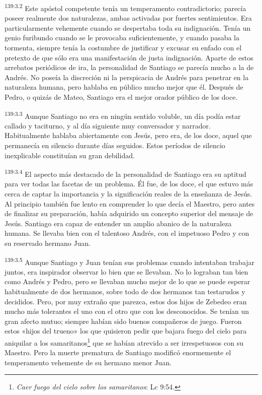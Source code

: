 \par
\textsuperscript{139:3.2} Este apóstol competente tenía un temperamento contradictorio; parecía poseer realmente dos naturalezas, ambas activadas por fuertes sentimientos. Era particularmente vehemente cuando se despertaba toda su indignación. Tenía un genio furibundo cuando se le provocaba suficientemente, y cuando pasaba la tormenta, siempre tenía la costumbre de justificar y excusar su enfado con el pretexto de que sólo era una manifestación de justa indignación. Aparte de estos arrebatos periódicos de ira, la personalidad de Santiago se parecía mucho a la de Andrés. No poseía la discreción ni la perspicacia de Andrés para penetrar en la naturaleza humana, pero hablaba en público mucho mejor que él. Después de Pedro, o quizás de Mateo, Santiago era el mejor orador público de los doce.

\par
\textsuperscript{139:3.3} Aunque Santiago no era en ningún sentido voluble, un día podía estar callado y taciturno, y al día siguiente muy conversador y narrador. Habitualmente hablaba abiertamente con Jesús, pero era, de los doce, aquel que permanecía en silencio durante días seguidos. Estos períodos de silencio inexplicable constituían su gran debilidad.

\par
\textsuperscript{139:3.4} El aspecto más destacado de la personalidad de Santiago era su aptitud para ver todas las facetas de un problema. Él fue, de los doce, el que estuvo más cerca de captar la importancia y la significación reales de la enseñanza de Jesús. Al principio también fue lento en comprender lo que decía el Maestro, pero antes de finalizar su preparación, había adquirido un concepto superior del mensaje de Jesús. Santiago era capaz de entender un amplio abanico de la naturaleza humana. Se llevaba bien con el talentoso Andrés, con el impetuoso Pedro y con su reservado hermano Juan.

\par
\textsuperscript{139:3.5} Aunque Santiago y Juan tenían sus problemas cuando intentaban trabajar juntos, era inspirador observar lo bien que se llevaban. No lo lograban tan bien como Andrés y Pedro, pero se llevaban mucho mejor de lo que se puede esperar habitualmente de dos hermanos, sobre todo de dos hermanos tan testarudos y decididos. Pero, por muy extraño que parezca, estos dos hijos de Zebedeo eran mucho más tolerantes el uno con el otro que con los desconocidos. Se tenían un gran afecto mutuo; siempre habían sido buenos compañeros de juego. Fueron estos «hijos del trueno» los que quisieron pedir que bajara fuego del cielo para aniquilar a los samaritanos\footnote{\textit{Caer fuego del cielo sobre los samaritanos}: Lc 9:54.} que se habían atrevido a ser irrespetuosos con su Maestro. Pero la muerte prematura de Santiago modificó enormemente el temperamento vehemente de su hermano menor Juan.

